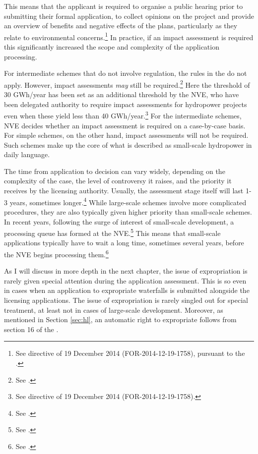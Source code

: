This means that the applicant is required to organise a public hearing prior to submitting their formal application, to collect opinions on the project and provide an overview of benefits and negative effects of the plans, particularly as they relate to environmental concerns.\footnote{See directive of 19 December 2014 (FOR-2014-12-19-1758), pursuant to the \cite[1-2,14-6]{pb08}.} In practice, if an impact assessment is required this significantly increased the scope and complexity of the application processing.

For intermediate schemes that do not involve regulation, the rules in the \cite{wra17} do not apply. However, impact assessments {\it may} still be required.\footnote{See \cite[20]{stokker10}.} Here the threshold of 30 GWh/year has been set as an additional threshold by the NVE, who have been delegated authority to require impact assessments for hydropower projects even when these yield less than 40 GWh/year.\footnote{See directive of 19 December 2014 (FOR-2014-12-19-1758).} For the intermediate schemes, NVE decides whether an impact assessment is required on a case-by-case basis. For simple schemes, on the other hand, impact assessments will not be required. Such schemes make up the core of what is described as small-scale hydropower in daily language.

The time from application to decision can vary widely, depending on the complexity of the case, the level of controversy it raises, and the priority it receives by the licensing authority. Usually, the assessment stage itself will last 1-3 years, sometimes longer.\footnote{See \cite[84-85]{nou129}.} While large-scale schemes involve more complicated procedures, they are also typically given higher priority than small-scale schemes. In recent years, following the surge of interest of small-scale development, a processing queue has formed at the NVE.\footnote{See \cite[84]{nou129}.} This means that small-scale applications typically have to wait a long time, sometimes several years, before the NVE begins processing them.\footnote{See \cite[84]{nou129}.}

As I will discuss in more depth in the next chapter, the issue of expropriation is rarely given special attention during the application assessment. This is so even in cases when an application to expropriate waterfalls is submitted alongside the licensing applications. The issue of expropriation is rarely singled out for special treatment, at least not in cases of large-scale development. Moreover, as mentioned in Section \ref{sec:hl}, an automatic right to expropriate follows from section 16 of the \cite{wra17}.

